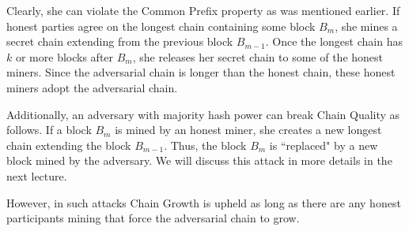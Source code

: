 Clearly, she can violate the Common Prefix property as was mentioned earlier. If honest parties agree on the longest chain containing some block $B_m$, she mines a secret chain extending from the previous block $B_{m-1}$. Once the longest chain has $k$ or more blocks after $B_m$, she releases her secret chain to some of the honest miners. Since the adversarial chain is longer than the honest chain, these honest miners adopt the adversarial chain.

Additionally, an adversary with majority hash power can break Chain Quality as follows. If a block $B_m$ is mined by an honest miner, she creates a new longest chain extending the block $B_{m-1}$. Thus, the block $B_m$ is ``replaced" by a new block mined by the adversary. We will discuss this attack in more details in the next lecture.

However, in such attacks Chain Growth is upheld as long as there are any honest participants mining that force the adversarial chain to grow.
